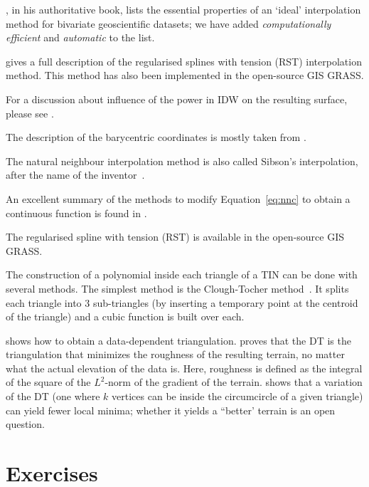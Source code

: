 \citet{Watson92}, in his authoritative book, lists the essential properties of an `ideal' interpolation method for bivariate geoscientific datasets; we have added \emph{computationally efficient} and \emph{automatic} to the list.

\citet{Mitasova93} gives a full description of the regularised splines with tension (RST) interpolation method.
This method has also been implemented in the open-source GIS GRASS\@.

For a discussion about influence of the power in IDW on the resulting surface, please see \citet{Watson92}.

The description of the barycentric coordinates is mostly taken from \citet{Eberly18}.

The natural neighbour interpolation method is also called Sibson's interpolation, after the name of the inventor~\citep{Sibson81}. 

An excellent summary of the methods to modify Equation~\ref{eq:nnc} to obtain a continuous function is found in \citet{Flototto03}. 

The regularised spline with tension (RST) is available in the open-source GIS GRASS\@.

The construction of a polynomial inside each triangle of a TIN can be done with several methods. 
The simplest method is the Clough-Tocher method~\citep{Clough65,Farin85}.
It splits each triangle into 3 sub-triangles (by inserting a temporary point at the centroid of the triangle) and a cubic function is built over each.

\citet{Dyn90} shows how to obtain a data-dependent triangulation.
\citet{Rippa90} proves that the DT is the triangulation that minimizes the roughness of the resulting terrain, no matter what the actual elevation of the data is. 
Here, roughness is defined as the integral of the square of the $L^2$-norm of the gradient of the terrain.
\citet{Gudmundsson02} shows that a variation of the DT (one where $k$ vertices can be inside the circumcircle of a given triangle) can yield fewer local minima; whether it yields a ``better' terrain is an open question.


%
\newpage
\section{Exercises}

